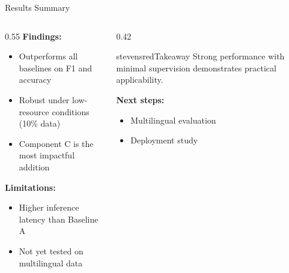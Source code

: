 \begin{frame}{Results Summary}

\begin{columns}
\begin{column}{0.55\textwidth}
\textbf{Findings:}
\begin{itemize}
    \item Outperforms all baselines on F1 and accuracy
    \item Robust under low-resource conditions (10\% data)
    \item Component C is the most impactful addition
\end{itemize}

\vspace{0.5em}
\textbf{Limitations:}
\begin{itemize}
    \item Higher inference latency than Baseline A
    \item Not yet tested on multilingual data
\end{itemize}
\end{column}
\begin{column}{0.42\textwidth}

\begin{colorblock}[white]{stevensred}{Takeaway}
Strong performance with minimal supervision demonstrates practical applicability.
\end{colorblock}

\vspace{0.5em}
\textbf{Next steps:}
\begin{itemize}
    \item Multilingual evaluation
    \item Deployment study
\end{itemize}
\end{column}
\end{columns}
\end{frame}
